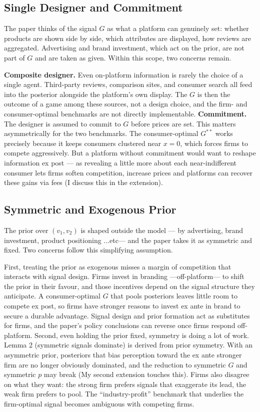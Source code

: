 \documentclass[12pt, a4paper]{article}
\begin{document}
\subsection{Single Designer and Commitment}

The paper thinks of the signal $G$ as what a platform can genuinely set: whether products are shown side by side, which attributes are displayed, how reviews are aggregated. Advertising and brand investment, which act on the prior, are not part of $G$ and are taken as given. Within this scope, two concerns remain.


    \textbf{Composite designer.} Even on-platform information is rarely the choice of a single agent. Third-party reviews, comparison sites, and consumer search all feed into the posterior alongside the platform's own display. The $G$ is then the outcome of a game among these sources, not a design choice, and the firm- and consumer-optimal benchmarks are not directly implementable.
     \textbf{Commitment.} The designer is assumed to commit to $G$ before prices are set. This matters asymmetrically for the two benchmarks. The consumer-optimal $G^{**}$ works precisely because it keeps consumers clustered near $x = 0$, which forces firms to compete aggressively. But a platform without commitment would want to reshape information ex post --- as revealing a little more about each near-indifferent consumer lets firms soften competition, increase prices and platforms can recover these gains via fees (I discuss this in the extension).


\subsection{Symmetric and Exogenous Prior}

The prior over $(v_1, v_2)$ is shaped outside the model --- by advertising, brand investment, product positioning ...etc--- and the paper takes it as symmetric and fixed. Two concerns follow this simplifying assumption.

     First, treating the prior as exogenous misses a margin of competition that interacts with signal design. Firms invest in branding ---off-platform--- to shift the prior in their favour, and those incentives depend on the signal structure they anticipate. A consumer-optimal $G$ that pools posteriors leaves little room to compete ex post, so firms have stronger reasons to invest ex ante in brand to secure a durable advantage. Signal design and prior formation act as substitutes for firms, and the paper's policy conclusions can reverse once firms respond off-platform.
     Second, even holding the prior fixed, symmetry is doing a lot of work. Lemma 2 (symmetric signals dominate) is derived from prior symmetry. With an asymmetric prior, posteriors that bias perception toward the ex ante stronger firm are no longer obviously dominated, and the reduction to symmetric $G$ and symmetric $p$ may break (My second extension touches this). Firms also disagree on what they want: the strong firm prefers signals that exaggerate its lead, the weak firm prefers to pool. The ``industry-profit'' benchmark that underlies the firm-optimal signal becomes ambiguous with competing firms.
\end{document}
